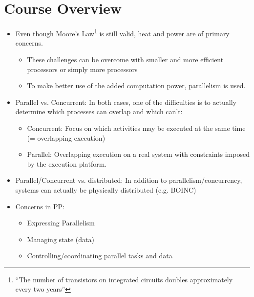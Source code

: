 \documentclass[a4paper]{article}
\begin{document}
\section{Course Overview}
\begin{itemize}
\item Even though Moore's Law\footnote{``The number of transistors on integrated circuits doubles approximately every two years''} is still valid, heat and power are of primary concerns. 
\begin{itemize}
\item These challenges can be overcome with smaller and more efficient processors or simply more processors
\item To make better use of the added computation power, parallelism is used.
\end{itemize}
\item Parallel vs. Concurrent: In both cases, one of the difficulties is to actually determine which processes can overlap and which can't:
\begin{itemize}
\item Concurrent: Focus on which activities may be executed at the same time (= overlapping execution)
\item Parallel: Overlapping execution on a real system with constraints imposed by the execution platform.
\end{itemize}
\item Parallel/Concurrent vs. distributed: In addition to parallelism/concurrency, systems can actually be physically distributed (e.g. BOINC)
\item Concerns in PP:
\begin{itemize}
\item Expressing Parallelism
\item Managing state (data)
\item Controlling/coordinating parallel tasks and data
\end{itemize}
\end{itemize}
\end{document}
